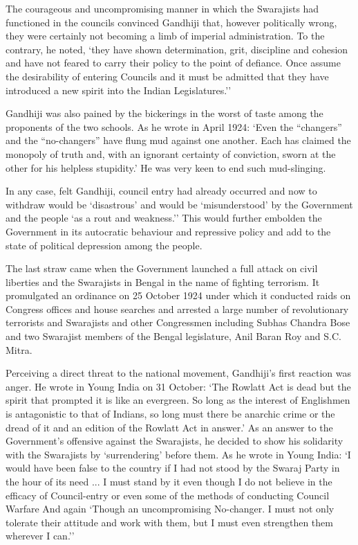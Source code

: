 \begin{multicols}{2}
The courageous and uncompromising manner in which the Swarajists had functioned in the councils convinced Gandhiji that, however politically wrong, they were certainly not becoming a limb of imperial administration. To the contrary, he noted, `they have shown determination, grit, discipline and cohesion and have not feared to carry their policy to the point of defiance. Once assume the desirability of entering Councils and it must be admitted that they have introduced a new spirit into the Indian Legislatures.''

Gandhiji was also pained by the bickerings in the worst of taste among the proponents of the two schools. As he wrote in April 1924: `Even the ``changers'' and the ``no-changers'' have flung mud against one another. Each has claimed the monopoly of truth and, with an ignorant certainty of conviction, sworn at the other for his helpless stupidity.' He was very keen to end such mud-slinging.

In any case, felt Gandhiji, council entry had already occurred and now to withdraw would be `disastrous' and would be `misunderstood' by the Government and the people `as a rout and weakness.'' This would further embolden the Government in its autocratic behaviour and repressive policy and add to the state of political depression among the people.

The last straw came when the Government launched a full attack on civil liberties and the Swarajists in Bengal in the name of fighting terrorism. It promulgated an ordinance on 25 October 1924 under which it conducted raids on Congress offices and house searches and arrested a large number of revolutionary terrorists and Swarajists and other Congressmen including Subhas Chandra Bose and two Swarajist members of the Bengal legislature, Anil Baran Roy and S.C. Mitra.

Perceiving a direct threat to the national movement, Gandhiji's first reaction was anger. He wrote in Young India on 31 October: `The Rowlatt Act is dead but the spirit that prompted it is like an evergreen. So long as the interest of Englishmen is antagonistic to that of Indians, so long must there be anarchic crime or the dread of it and an edition of the Rowlatt Act in answer.' As an answer to the Government's offensive against the Swarajists, he decided to show his solidarity with the Swarajists by `surrendering' before them. As he wrote in Young India: `I would have been false to the country if I had not stood by the Swaraj Party in the hour of its need ... I must stand by it even though I do not believe in the efficacy of Council-entry or even some of the methods of conducting Council Warfare And again `Though an uncompromising No-changer. I must not only tolerate their attitude and work with them, but I must even strengthen them wherever I can.''


\end{multicols}
